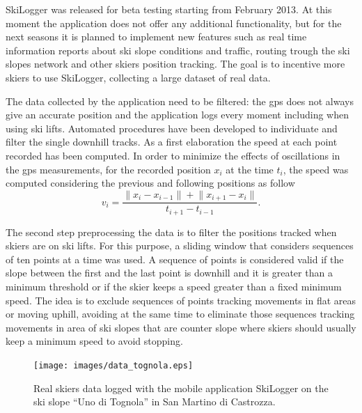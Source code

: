 \documentclass[12pt,a4paper,twoside]{book}
\newcommand{\norm}[1]{\lVert#1\rVert}
\begin{document}
SkiLogger was released for beta testing starting from February 2013. At this moment the application does not offer any additional functionality, but for the next seasons it is planned to implement new features such as real time information reports about ski slope conditions and traffic, routing trough the ski slopes network and other skiers position tracking. The goal is to incentive more skiers to use SkiLogger, collecting a large dataset of real data.

The data collected by the application need to be filtered: the gps does not always give an accurate position and the application logs every moment including when using ski lifts. Automated procedures have been developed to individuate and filter the single downhill tracks. As a first elaboration the speed at each point recorded has been computed. In order to minimize the effects of oscillations in the gps measurements, for the recorded position $x_i$ at the time $t_i$, the speed was computed considering the previous and following positions as follow
\begin{equation}
v_i=\frac{\norm{x_i-x_{i-1}}+\norm{x_{i+1}-x_i}}{t_{i+1}-t_{i-1}}.
\end{equation}

The second step preprocessing the data is to filter the positions tracked when skiers are on ski lifts. For this purpose, a sliding window that considers sequences of ten points at a time was used. A sequence of points is considered valid if the slope between the first and the last point is downhill and it is greater than a minimum threshold or if the skier keeps a speed greater than a fixed minimum speed. The idea is to exclude sequences of points tracking movements in flat areas or moving uphill, avoiding at the same time to eliminate those sequences tracking movements in area of ski slopes that are counter slope where skiers should usually keep a minimum speed to avoid stopping.

\begin{figure}[!b]
  \begin{center}
    \texttt{[image: images/data\_tognola.eps]}
    \caption{Real skiers data logged with the mobile application SkiLogger on the ski slope ``Uno di Tognola'' in San Martino di Castrozza.}\label{data_tognola}
  \end{center}
\end{figure}
\end{document}
